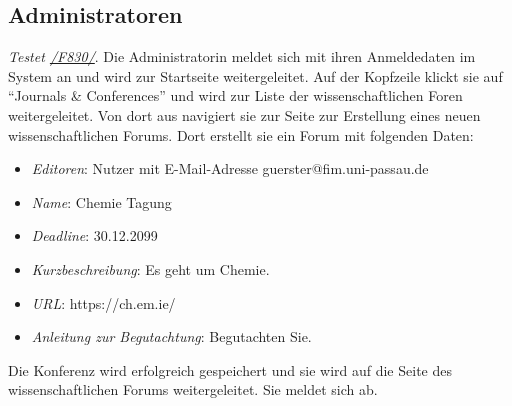 \subsection{Administratoren}
\begin{description}

	 \emph{Testet \hyperref[funkt:830]{/F830/}}.
	Die Administratorin meldet sich mit ihren Anmeldedaten im System an und wird zur Startseite weitergeleitet.
	Auf der Kopfzeile klickt sie auf ``Journals \& Conferences'' und wird zur Liste der wissenschaftlichen Foren weitergeleitet.
	Von dort aus navigiert sie zur Seite zur Erstellung eines neuen wissenschaftlichen Forums.
	Dort erstellt sie ein Forum mit folgenden Daten:
	\begin{itemize}
		\item \emph{Editoren}: Nutzer mit E-Mail-Adresse guerster@fim.uni-passau.de
		\item \emph{Name}: Chemie Tagung
		\item \emph{Deadline}: 30.12.2099
		\item \emph{Kurzbeschreibung}: Es geht um Chemie.
		\item \emph{URL}: https://ch.em.ie/
		\item \emph{Anleitung zur Begutachtung}: Begutachten Sie.
	\end{itemize}
	Die Konferenz wird erfolgreich gespeichert und sie wird auf die Seite des wissenschaftlichen Forums weitergeleitet.
	Sie meldet sich ab.

\end{description}

